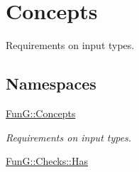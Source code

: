 \hypertarget{group__ConceptGroup}{}\section{Concepts}
\label{group__ConceptGroup}


Requirements on input types.  


\subsection*{Namespaces}
\begin{DoxyCompactItemize}
\item 
 \hyperlink{namespaceFunG_1_1Concepts}{Fun\+G\+::\+Concepts}
\begin{DoxyCompactList}\small\item\em Requirements on input types. \end{DoxyCompactList}\item 
 \hyperlink{namespaceFunG_1_1Checks_1_1Has}{Fun\+G\+::\+Checks\+::\+Has}
\end{DoxyCompactItemize}
